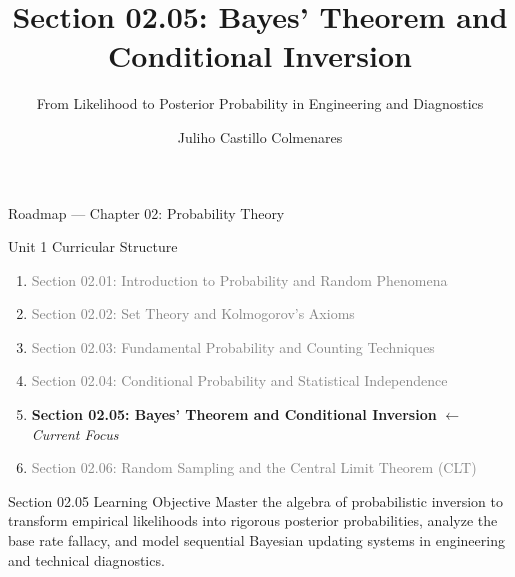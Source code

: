 \documentclass[10pt, aspectratio=169]{beamer}
\title[Bayes' Theorem]{Section 02.05: Bayes' Theorem and Conditional Inversion}
\subtitle{From Likelihood to Posterior Probability in Engineering and Diagnostics}
\author[J. Castillo Colmenares]{Juliho Castillo Colmenares}
\institute{Tecnológico de Monterrey}
\date{\vspace{-2.0cm}}
\begin{document}
\begin{frame}[plain]
  \vspace{-0.5cm}
  \titlepage
\end{frame}

\begin{frame}{Roadmap --- Chapter 02: Probability Theory}
  \begin{block}{Unit 1 Curricular Structure}
    \footnotesize
    \begin{enumerate}\itemsep=0.08cm
      \item \textcolor{gray}{Section 02.01: Introduction to Probability and Random Phenomena}
      \item \textcolor{gray}{Section 02.02: Set Theory and Kolmogorov's Axioms}
      \item \textcolor{gray}{Section 02.03: Fundamental Probability and Counting Techniques}
      \item \textcolor{gray}{Section 02.04: Conditional Probability and Statistical Independence}
      \item \textbf{\textcolor{TecRojo}{Section 02.05: Bayes' Theorem and Conditional Inversion}} $\leftarrow$ \emph{Current Focus}
      \item \textcolor{gray}{Section 02.06: Random Sampling and the Central Limit Theorem (CLT)}
    \end{enumerate}
  \end{block}
  \vspace{-0.05cm}
  \pause
  \begin{alertblock}{Section 02.05 Learning Objective}
    \footnotesize
    Master the algebra of probabilistic inversion to transform empirical likelihoods into rigorous posterior probabilities, analyze the base rate fallacy, and model sequential Bayesian updating systems in engineering and technical diagnostics.
  \end{alertblock}
\end{frame}
\end{document}
